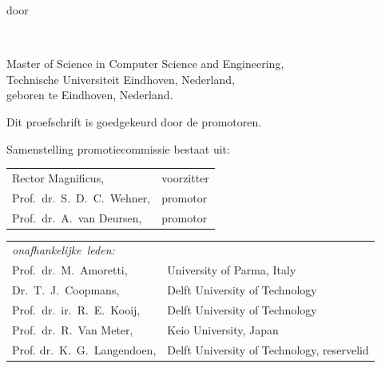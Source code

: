 \begin{titlepage}
\begin{center}
\bigskip
\bigskip

door

\bigskip
\bigskip

\makeatletter
{\Large\titlefont\bfseries\@firstname\ \titleshape{\MakeUppercase{\@lastname}}}
\makeatother

\bigskip
\bigskip

Master of Science in Computer Science and Engineering, \\
Technische Universiteit Eindhoven, Nederland, \\
geboren te Eindhoven, Nederland.

\vspace*{2\bigskipamount}

\end{center}

\clearpage
\thispagestyle{empty}

\noindent
Dit proefschrift is goedgekeurd door de promotoren.

\bigskip\noindent
Samenstelling promotiecommissie bestaat uit:

\medskip\noindent
\begin{tabular}{p{4.5cm}l}
    Rector Magnificus, & voorzitter \\
    Prof.\ dr.\ S.\ D.\ C.\ Wehner, & promotor \\
    Prof.\ dr.\ A.\ van Deursen, & promotor \\
\end{tabular}

\medskip\noindent
\begin{tabular}{p{4.5cm}l}
    \mbox{\emph{onafhankelijke leden:}} & \\
    Prof.\ dr.\ M.\ Amoretti,                & University of Parma, Italy \\
    Dr.\ T.\ J.\ Coopmans,              & Delft University of Technology \\
    Prof.\ dr.\ ir.\ R.\ E.\ Kooij,     & Delft University of Technology \\
    Prof.\ dr.\ R.\ Van Meter,          & Keio University, Japan \\
    Prof. dr.\ K.\ G.\ Langendoen,      & Delft University of Technology, reservelid \\
\end{tabular}


\end{titlepage}
